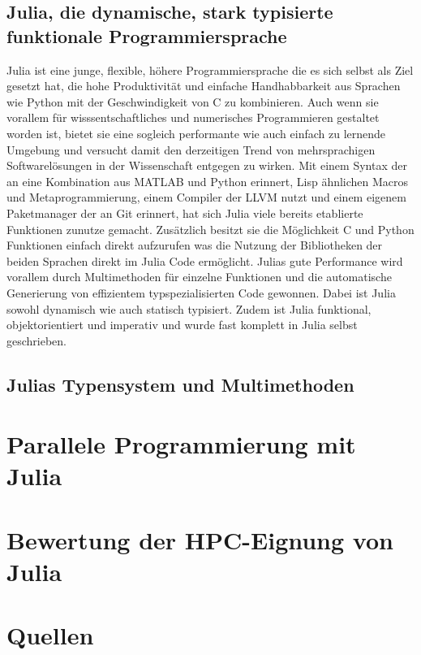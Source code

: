 \documentclass[proseminar,german,utf8]{zihpub}
\begin{document}
\subsection{Julia, die dynamische, stark typisierte funktionale Programmiersprache}
Julia ist eine junge, flexible, höhere Programmiersprache die es sich selbst als Ziel gesetzt hat, die hohe Produktivität und einfache Handhabbarkeit aus Sprachen wie Python mit der Geschwindigkeit von C zu kombinieren. Auch wenn sie vorallem für wisssentschaftliches und numerisches Programmieren gestaltet worden ist, bietet sie eine sogleich performante wie auch einfach zu lernende Umgebung und versucht damit den derzeitigen Trend von mehrsprachigen Softwarelösungen in der Wissenschaft entgegen zu wirken. Mit einem Syntax der an eine Kombination aus MATLAB und Python erinnert, Lisp ähnlichen Macros und Metaprogrammierung, einem Compiler der LLVM nutzt und einem eigenem Paketmanager der an Git erinnert, hat sich Julia viele bereits etablierte Funktionen zunutze gemacht. Zusätzlich besitzt sie die Möglichkeit C und Python Funktionen einfach direkt aufzurufen was die Nutzung der Bibliotheken der beiden Sprachen direkt im Julia Code ermöglicht. Julias gute Performance wird vorallem durch Multimethoden für einzelne Funktionen und die automatische Generierung von effizientem typspezialisierten Code gewonnen. Dabei ist Julia sowohl dynamisch wie auch statisch typisiert. Zudem ist Julia funktional, objektorientiert und imperativ und wurde fast komplett in Julia selbst geschrieben.
\subsection{Julias Typensystem und Multimethoden}

\section{Parallele Programmierung mit Julia}
\section{Bewertung der HPC-Eignung von Julia}
\section{Quellen}
\end{document}
